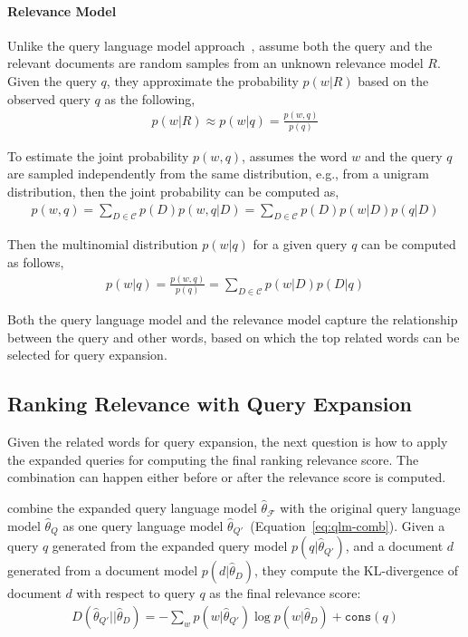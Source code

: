 \paragraph{Relevance Model}

Unlike the query language model approach~\citep{zhai-01b},
\cite{Lavrenko-2001} assume both the query and the relevant documents
are random samples from an unknown relevance model $R$. Given the
query $q$, they approximate the probability $p(w|R)$ based on the
observed query $q$ as the following,
\begin{align}
p(w|R) \approx p(w|q) = \frac{p(w,q)}{p(q)}
\end{align}

To estimate the joint probability $p(w,q)$, \cite{Lavrenko-2001} assumes the word $w$ and the query $q$ are sampled independently from the same distribution, e.g., from a unigram distribution, then the joint probability can be computed as,
\begin{align}
p(w, q) = \sum_{D \in \mathcal{C}} p(D) p(w,q | D) = \sum_{D \in \mathcal{C}} p(D) p(w|D) p(q | D)
\end{align}

Then the multinomial distribution $p(w|q)$ for a given query $q$ can be computed as follows,
\begin{align}
\label{eq:rm_qe}
p(w|q) = \frac{p(w, q)}{p(q)} = \sum_{D \in \mathcal{C}} p(w|D) p(D|q)
\end{align}

Both the query language model and the relevance model capture the relationship between the query and other words, based on which the top related words can be selected for query expansion.

\subsection{Ranking Relevance with Query Expansion}

Given the related words for query expansion, the next question is how to apply the expanded queries for computing the final ranking relevance score. The combination can happen either before or after the relevance score is computed.

\cite{zhai-01b} combine the expanded query language model $\hat{\theta}_{\mathcal{F}}$ with the original query language model $\hat{\theta}_{Q}$ as one query language model $\hat{\theta}_{Q'} $~(Equation~\ref{eq:qlm-comb}). Given a query $q$ generated from the expanded query model $p(q|\hat{\theta}_{Q'})$, and a document $d$ generated from a document model $p(d|\hat{\theta}_D)$, they compute the KL-divergence of document $d$ with respect to query $q$ as the final relevance score:
\begin{align}
D(\hat{\theta}_{Q'} || \hat{\theta}_D) = -\sum_w p(w|\hat{\theta}_{Q'}) \log p(w | \hat{\theta}_D) + \texttt{cons}(q)
\end{align}

